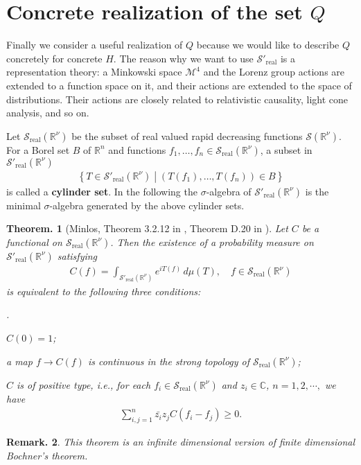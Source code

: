 \documentclass[openany, a4paper, oneside]{jsbook}
\newcounter{enum2}
\renewenvironment{enumerate}{%
\begin{list}%
{%
\arabic{enum2}.\ \,%
}%
{%
\usecounter{enum2}
\setlength{\itemindent}{0pt}%
\setlength{\leftmargin}{15pt}%
\setlength{\rightmargin}{0pt}%
\setlength{\labelsep}{0pt}%
\setlength{\labelwidth}{6pt}%
\setlength{\itemsep}{0pt}%
\setlength{\parsep}{0pt}%
\setlength{\listparindent}{0pt}%
}
}{%
\end{list}%
}
\theoremstyle{break}
\newtheorem{thm}{Theorem.}[section]
\theoremstyle{breakdefn}
\newtheorem{rem}[thm]{Remark.}
\newcommand{\rbk}[1]{\left (#1\right)}
\newcommand{\relmiddle}[1]{\mathrel{}\middle#1\mathrel{}}
\newcommand{\set}[2]{\left\{#1 \relmiddle| #2\right\}}
\newcommand{\bbC}{\mathbb{C}}
\newcommand{\bbR}{\mathbb{R}}
\newcommand{\bbRnu}{\mathbb{R}^{\nu}}
\newcommand{\calM}{\mathcal{M}}
\newcommand{\calS}{\mathcal{S}}
\newcommand{\realtempereddist}{\mathcal{S}'_{\mathrm{real}}}
\newcommand{\realrapiddecrease}{\mathcal{S}_{\mathrm{real}}}
\begin{document}
\section{Concrete realization of the set $Q$}


Finally we consider a useful realization of $Q$ because we would like to describe $Q$ concretely for concrete $H$.
The reason why we want to use $\realtempereddist$ is a representation theory:
a Minkowski space $\calM^4$ and the Lorenz group actions are extended to a function space on it,
and their actions are extended to the space of distributions.
Their actions are closely related to relativistic causality, light cone analysis, and so on.

Let $\realrapiddecrease (\bbRnu)$ be the subset of real valued rapid decreasing functions $\calS (\bbRnu)$.
For a Borel set $B$ of $\bbR^n$ and functions $f_1, \dots, f_n \in \realrapiddecrease (\bbRnu)$,
a subset in $\realtempereddist (\bbRnu)$
\begin{align}
 \set{ T \in \realtempereddist (\bbRnu)}{\rbk{T (f_1), \dots, T (f_n)} \in B}
\end{align}
is called a \textbf{cylinder set}.
In the following the $\sigma$-algebra of $\realtempereddist (\bbRnu)$ is the minimal $\sigma$-algebra
generated by the above cylinder sets.

\begin{thm}[Minlos, Theorem 3.2.12 in \cite{AraiEzawa3}, Theorem D.20 in \cite{AsaoArai5}]
 Let $C$ be a functional on $\realrapiddecrease (\bbRnu)$.
 Then the existence of a probability measure on $\realtempereddist (\bbRnu)$ satisfying
 \begin{align}
  C (f)
  =
  \int_{\realtempereddist (\bbRnu)} e^{i T (f)} \, d \mu (T), \quad f \in \realrapiddecrease (\bbRnu)
 \end{align}
 is equivalent to the following three conditions:
\begin{enumerate}
\item $C (0) = 1$;
\item a map $f \to C (f)$ is continuous in the strong topology of $\realrapiddecrease (\bbRnu)$;
\item $C$ is of positive type, i.e., for each $f_i \in \realrapiddecrease (\bbRnu)$ and $z_i \in \bbC$, $n=1,2,\cdots,$ we have
    \begin{align}
     \sum_{i,j = 1}^{n} \bar{z_i} z_j C (f_i - f_j) \geq 0.
    \end{align}
\end{enumerate}
\end{thm}
\begin{rem}
 This theorem is an infinite dimensional version of finite dimensional Bochner's theorem.
\end{rem}
\end{document}
